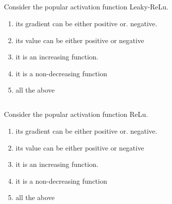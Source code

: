 
\begin{frame}
\section{}
Consider the popular activation function Leaky-ReLu.
\begin{enumerate}[label=(\Alph*)]
\item its gradient can be either positive or. negative.
\item its value can be either positive or negative
\item it is an increasing function.   %
\item it is a non-decreasing function   %
\item all the above   %
\end{enumerate}

\end{frame}

\begin{frame}
\section{}
Consider the popular activation function ReLu.
\begin{enumerate}[label=(\Alph*)]
\item its gradient can be either positive or. negative.
\item its value can be either positive or negative
\item it is an increasing function.
\item it is a non-decreasing function   %
\item all the above   %
\end{enumerate}

\end{frame}

